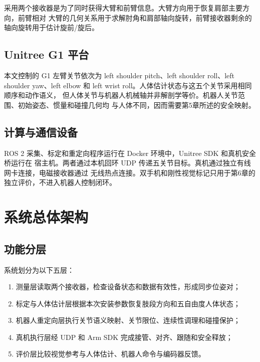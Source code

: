采用两个接收器是为了同时获得大臂和前臂信息。大臂方向用于恢复肩部主要方向，前臂相对
大臂的几何关系用于求解肘角和肩部轴向旋转，前臂接收器剩余的轴向旋转用于估计旋前/旋后。

\subsection{Unitree G1 平台}
\label{subsec:ch3_g1_platform}

本文控制的 G1 左臂关节依次为 left shoulder pitch、left shoulder roll、left shoulder
yaw、left elbow 和 left wrist roll。人体估计状态与这五个关节采用相同顺序和动作语义，
但人体关节与机器人机械轴并非解剖学等价。机器人关节范围、初始姿态、惯量和碰撞几何均
与人体不同，因而需要第5章所述的安全映射。

\subsection{计算与通信设备}
\label{subsec:ch3_computing_communication}

ROS 2 采集、标定和重定向程序运行在 Docker 环境中，Unitree SDK 和真机安全桥运行在
宿主机。两者通过本机回环 UDP 传递五关节目标。真机通过独立有线网卡连接，电磁接收器通过
无线热点连接。双手机和刚性视觉标记只用于第6章的独立评价，不进入机器人控制闭环。

\section{系统总体架构}
\label{sec:ch3_overall_architecture}

\subsection{功能分层}
\label{subsec:ch3_functional_layers}

系统划分为以下五层：
\begin{enumerate}[label=\arabic*)]
  \item 测量层读取两个接收器，检查设备状态和数据有效性，形成同步位姿对；
  \item 标定与人体估计层根据本次安装参数恢复肢段方向和五自由度人体状态；
  \item 机器人重定向层执行关节语义映射、关节限位、连续性调理和碰撞保护；
  \item 真机执行层经 UDP 和 Arm SDK 完成接管、对齐、跟随和安全释放；
  \item 评价层比较视觉参考与人体估计、机器人命令与编码器反馈。
\end{enumerate}

